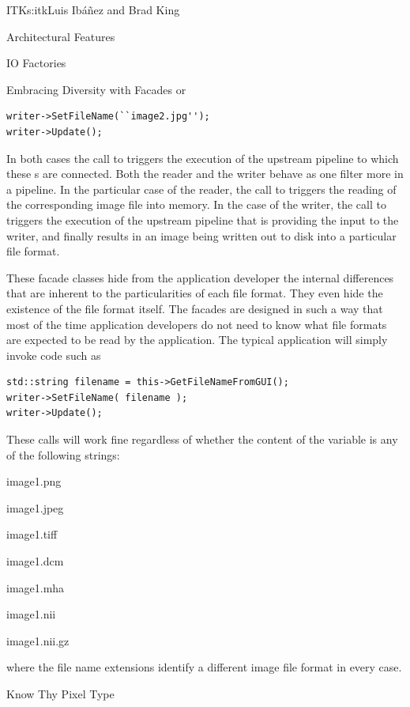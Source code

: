 \begin{aosachapter}{ITK}{s:itk}{Luis Ib\'{a}\~{n}ez and Brad King}
\begin{aosasect1}{Architectural Features}
\begin{aosasect2}{IO Factories}
\begin{aosasect3}{Embracing Diversity with Facades}
\noindent or

\begin{verbatim}
writer->SetFileName(``image2.jpg'');
writer->Update();
\end{verbatim}

\noindent In both cases the call to  triggers the execution of the
upstream pipeline to which these s are connected. Both the
reader and the writer behave as one filter more in a pipeline. In the
particular case of the reader, the call to  triggers the reading
of the corresponding image file into memory. In the case of the writer, the
call to  triggers the execution of the upstream pipeline that is
providing the input to the writer, and finally results in an image being
written out to disk into a particular file format.

These facade classes hide from the application developer the
internal differences that are inherent to the particularities of
each file format. They even hide the existence of the file format
itself. The facades are designed in such a way that most of the
time application developers do not need to know what file formats
are expected to be read by the application. The typical
application will simply invoke code such as

\begin{verbatim}
std::string filename = this->GetFileNameFromGUI();
writer->SetFileName( filename );
writer->Update();
\end{verbatim}

\noindent These calls will work fine regardless of whether the content of the
 variable is any of the following strings:

\begin{aosaitemize}
\item image1.png
\item image1.jpeg
\item image1.tiff
\item image1.dcm
\item image1.mha
\item image1.nii
\item image1.nii.gz
\end{aosaitemize}

\noindent where the file name extensions identify a different image file
format in every case.

\end{aosasect3}

\begin{aosasect3}{Know Thy Pixel Type}


\end{aosasect3}
\end{aosasect2}
\end{aosasect1}
\end{aosachapter}
